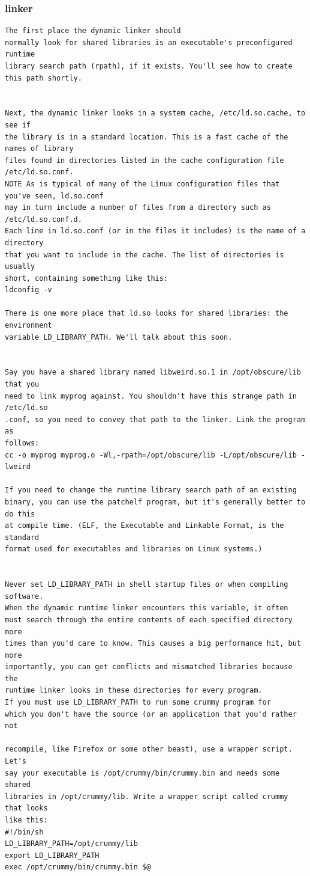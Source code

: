 \documentclass[paper=8.5in:11in, twoside, 12pt, pagesize=pdftex]{book}
\begin{document}
\subsubsection{linker}
\begin{lstlisting}
The first place the dynamic linker should
normally look for shared libraries is an executable's preconfigured runtime
library search path (rpath), if it exists. You'll see how to create this path shortly.


Next, the dynamic linker looks in a system cache, /etc/ld.so.cache, to see if
the library is in a standard location. This is a fast cache of the names of library
files found in directories listed in the cache configuration file /etc/ld.so.conf.
NOTE As is typical of many of the Linux configuration files that you've seen, ld.so.conf
may in turn include a number of files from a directory such as /etc/ld.so.conf.d.
Each line in ld.so.conf (or in the files it includes) is the name of a directory
that you want to include in the cache. The list of directories is usually
short, containing something like this:
ldconfig -v

There is one more place that ld.so looks for shared libraries: the environment
variable LD_LIBRARY_PATH. We'll talk about this soon.


Say you have a shared library named libweird.so.1 in /opt/obscure/lib that you
need to link myprog against. You shouldn't have this strange path in /etc/ld.so
.conf, so you need to convey that path to the linker. Link the program as
follows:
cc -o myprog myprog.o -Wl,-rpath=/opt/obscure/lib -L/opt/obscure/lib -lweird

If you need to change the runtime library search path of an existing
binary, you can use the patchelf program, but it's generally better to do this
at compile time. (ELF, the Executable and Linkable Format, is the standard
format used for executables and libraries on Linux systems.)


Never set LD_LIBRARY_PATH in shell startup files or when compiling software.
When the dynamic runtime linker encounters this variable, it often
must search through the entire contents of each specified directory more
times than you'd care to know. This causes a big performance hit, but more
importantly, you can get conflicts and mismatched libraries because the
runtime linker looks in these directories for every program.
If you must use LD_LIBRARY_PATH to run some crummy program for
which you don't have the source (or an application that you'd rather not

recompile, like Firefox or some other beast), use a wrapper script. Let's
say your executable is /opt/crummy/bin/crummy.bin and needs some shared
libraries in /opt/crummy/lib. Write a wrapper script called crummy that looks
like this:
#!/bin/sh
LD_LIBRARY_PATH=/opt/crummy/lib
export LD_LIBRARY_PATH
exec /opt/crummy/bin/crummy.bin $@

\end{lstlisting}
\end{document}
